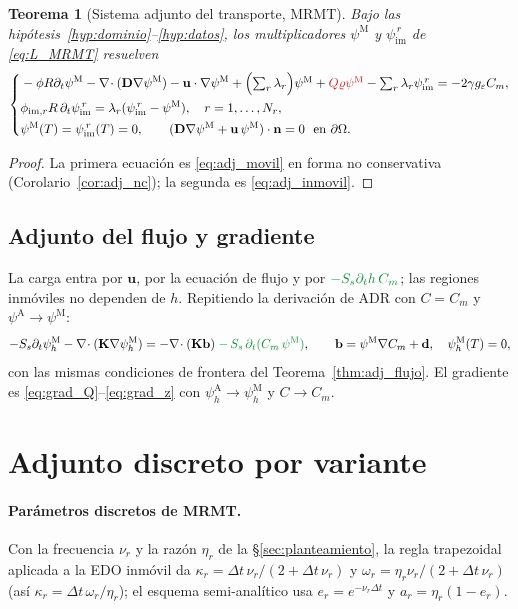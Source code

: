 \documentclass[11pt]{article}
\numberwithin{equation}{section}
\theoremstyle{plain}
\newtheorem{theorem}{Teorema}[section]
\theoremstyle{definition}
\theoremstyle{remark}
\newcommand{\bu}{\mathbf{u}}
\newcommand{\bK}{\mathbf{K}}
\newcommand{\bD}{\mathbf{D}}
\newcommand{\bn}{\mathbf{n}}
\newcommand{\bb}{\mathbf{b}}
\newcommand{\bd}{\mathbf{d}}
\newcommand{\Ceps}{g_\varepsilon}              %
\newcommand{\Nuc}{\varrho}                      %
\newcommand{\im}{\mathrm{im}}
\newcommand{\pA}{\psi^{\mathrm A}}          %
\newcommand{\pM}{\psi^{\mathrm M}}          %
\newcommand{\pim}{\psi_{\im}}               %
\newcommand{\phA}{\psi_h^{\mathrm A}}       %
\newcommand{\phM}{\psi_h^{\mathrm M}}       %
\newcommand{\sumi}[1]{{\color{cSum}#1}}
\newcommand{\alm}[1]{{\color{cAlm}#1}}
\begin{document}
\begin{theorem}[Sistema adjunto del transporte, MRMT]\label{thm:adj_MRMT}
Bajo las hipótesis~\ref{hyp:dominio}--\ref{hyp:datos}, los multiplicadores $\pM$ y $\pim^{\,r}$ de \eqref{eq:L_MRMT} resuelven
\begin{equation}
\left\{\begin{aligned}
&-\phi R\partial_t\pM-\nabla\!\cdot(\bD\nabla\pM)-\bu\cdot\nabla\pM
+\Bigl(\textstyle\sum_r\lambda_r\Bigr)\pM+\sumi{Q\Nuc\pM}-\textstyle\sum_r\lambda_r\pim^{\,r}=-2\gamma\Ceps C_m,\\
&\phi_{\im,r}R\,\partial_t\pim^{\,r}=\lambda_r(\pim^{\,r}-\pM),\quad r=1,\dots,N_r,\\
&\pM(T)=\pim^{\,r}(T)=0,\qquad(\bD\nabla\pM+\bu\,\pM)\cdot\bn=0\ \text{ en }\partial\Omega .
\end{aligned}\right.
\label{eq:sistema_adjunto_MRMT}
\end{equation}
\end{theorem}
\begin{proof}
La primera ecuación es \eqref{eq:adj_movil} en forma no conservativa (Corolario~\ref{cor:adj_nc}); la segunda es
\eqref{eq:adj_inmovil}.
\end{proof}

\subsection{Adjunto del flujo y gradiente}
La carga entra por $\bu$, por la ecuación de flujo y por $\alm{-S_s\partial_th\,C_m}$; las regiones inmóviles no
dependen de $h$. Repitiendo la derivación de ADR con $C=C_m$ y $\pA\to\pM$:
\begin{equation}
-S_s\partial_t\phM-\nabla\!\cdot(\bK\nabla\phM)=-\nabla\!\cdot(\bK\bb)\;\alm{-\,S_s\,\partial_t(C_m\,\pM)},
\qquad\bb=\pM\nabla C_m+\bd,\quad\phM(T)=0 ,
\label{eq:adj_flujo_MRMT}
\end{equation}
con las mismas condiciones de frontera del Teorema~\ref{thm:adj_flujo}. El gradiente es \eqref{eq:grad_Q}--\eqref{eq:grad_z} con $\phA\to\phM$ y $C\to C_m$.

\section{Adjunto discreto por variante}
\label{sec:discreto}

\paragraph{Parámetros discretos de MRMT.} Con la frecuencia $\nu_r$ y la razón $\eta_r$ de la \S\ref{sec:planteamiento}, la regla trapezoidal aplicada a la EDO inmóvil da
$\kappa_r=\Delta t\,\nu_r/(2+\Delta t\,\nu_r)$ y $\omega_r=\eta_r\nu_r/(2+\Delta t\,\nu_r)$ (así $\kappa_r=\Delta t\,\omega_r/\eta_r$); el esquema semi-analítico usa $e_r=e^{-\nu_r\Delta t}$ y $a_r=\eta_r(1-e_r)$.
\end{document}
